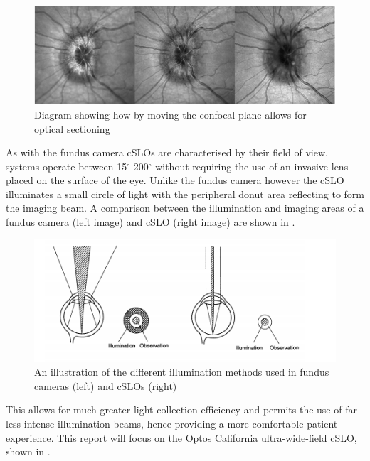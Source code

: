\begin{figure}[htbp]
\centering
  \includegraphics{figures/confocalimages}
\caption{Diagram showing how by moving the confocal plane allows for optical sectioning}
\label{fig:3dconfocal}
\end{figure}

As with the fundus camera cSLOs are characterised by their field of view, systems operate between 15$^\circ$-200$^\circ$ without requiring the use of an invasive lens placed on the surface of the eye. Unlike the fundus camera however the cSLO illuminates a small circle of light with the peripheral donut area reflecting to form the imaging beam. A comparison between the illumination and imaging areas of a fundus camera (left image) and cSLO (right image) are shown in  .


\begin{figure}[htbp]
\centering
  \includegraphics{figures/illumination}
\caption{An illustration of the different illumination methods used in fundus cameras (left) and cSLOs (right)}
\label{fig:illum}
     \end{figure}


This allows for much greater light collection efficiency and permits the use of far less intense illumination beams, hence providing a more comfortable patient experience. This report will focus on the Optos California ultra-wide-field cSLO, shown in . 

